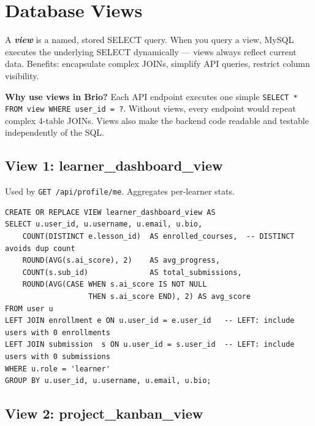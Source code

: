 \documentclass[11pt,a4paper]{article}
\newcommand{\term}[1]{\textbf{\textit{#1}}}
\newcommand{\T}[1]{\texttt{#1}}          %
\begin{document}
\section{Database Views}

\begin{defbox}
A \term{view} is a named, stored SELECT query. When you query a view, MySQL executes
the underlying SELECT dynamically — views always reflect current data.
Benefits: encapsulate complex JOINs, simplify API queries, restrict column visibility.
\end{defbox}

\begin{whybox}
\textbf{Why use views in Brio?} Each API endpoint executes one simple \T{SELECT * FROM
view WHERE user\_id = ?}. Without views, every endpoint would repeat complex 4-table
JOINs. Views also make the backend code readable and testable independently of the SQL.
\end{whybox}

\subsection{View 1: learner\_dashboard\_view}

Used by \T{GET /api/profile/me}. Aggregates per-learner stats.

\begin{lstlisting}[style=sql]
CREATE OR REPLACE VIEW learner_dashboard_view AS
SELECT u.user_id, u.username, u.email, u.bio,
    COUNT(DISTINCT e.lesson_id)  AS enrolled_courses,  -- DISTINCT avoids dup count
    ROUND(AVG(s.ai_score), 2)    AS avg_progress,
    COUNT(s.sub_id)              AS total_submissions,
    ROUND(AVG(CASE WHEN s.ai_score IS NOT NULL
                   THEN s.ai_score END), 2) AS avg_score
FROM user u
LEFT JOIN enrollment e ON u.user_id = e.user_id   -- LEFT: include users with 0 enrollments
LEFT JOIN submission  s ON u.user_id = s.user_id  -- LEFT: include users with 0 submissions
WHERE u.role = 'learner'
GROUP BY u.user_id, u.username, u.email, u.bio;
\end{lstlisting}

\subsection{View 2: project\_kanban\_view}
\end{document}
